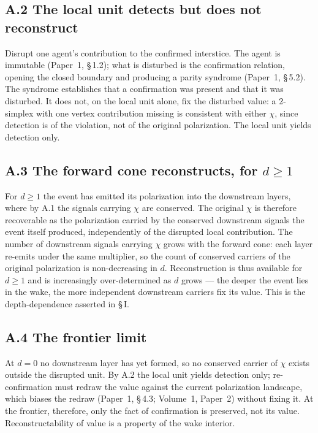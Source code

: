 \documentclass[11pt,oneside]{report}
\theoremstyle{definition}
\theoremstyle{remark}
\begin{document}
\subsection*{A.2 The local unit detects but does not reconstruct}

Disrupt one agent's contribution to the confirmed interstice. The agent
is immutable (Paper~1, \S\,1.2); what is disturbed is the confirmation
relation, opening the closed boundary and producing a parity syndrome
(Paper~1, \S\,5.2). The syndrome establishes that a confirmation was
present and that it was disturbed. It does not, on the local unit alone,
fix the disturbed value: a 2-simplex with one vertex contribution missing
is consistent with either \ensuremath{\chi}, since detection is of the
violation, not of the original polarization. The local unit yields
detection only.

\subsection*{A.3 The forward cone reconstructs, for \texorpdfstring{$d \geq 1$}{d >= 1}}

For \ensuremath{d \geq 1} the event has emitted its polarization into the
downstream layers, where by A.1 the signals carrying \ensuremath{\chi} are
conserved. The original \ensuremath{\chi} is therefore recoverable as the
polarization carried by the conserved downstream signals the event
itself produced, independently of the disrupted local contribution. The
number of downstream signals carrying \ensuremath{\chi} grows with the
forward cone: each layer re-emits under the same multiplier, so the count
of conserved carriers of the original polarization is non-decreasing in
\ensuremath{d}. Reconstruction is thus available for \ensuremath{d \geq 1}
and is increasingly over-determined as \ensuremath{d} grows --- the deeper
the event lies in the wake, the more independent downstream carriers fix
its value. This is the depth-dependence asserted in \S\,I.

\subsection*{A.4 The frontier limit}

At \ensuremath{d = 0} no downstream layer has yet formed, so no conserved
carrier of \ensuremath{\chi} exists outside the disrupted unit. By A.2 the
local unit yields detection only; re-confirmation must redraw the value
against the current polarization landscape, which biases the redraw
(Paper~1, \S\,4.3; Volume~1, Paper~2) without fixing it. At the frontier,
therefore, only the fact of confirmation is preserved, not its value.
Reconstructability of value is a property of the wake interior.
\end{document}
